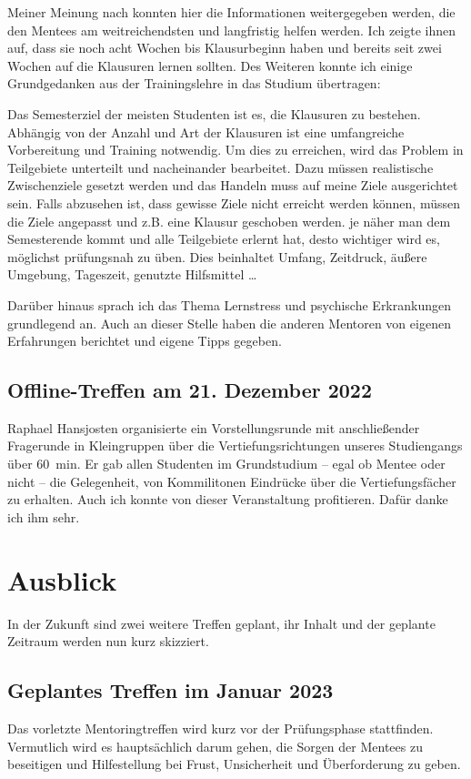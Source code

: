 \documentclass[
    paper=a4,
    div=calc,
    numbers=noendperiod,
    twocolumn,
]{scrartcl}
\begin{document}
        Meiner Meinung nach konnten hier die Informationen weitergegeben werden, die den Mentees am weitreichendsten und langfristig helfen werden. Ich zeigte ihnen auf, dass sie noch acht Wochen bis Klausurbeginn haben und bereits seit zwei Wochen auf die Klausuren lernen sollten. Des Weiteren konnte ich einige Grundgedanken aus der Trainingslehre in das Studium übertragen: 
        
        Das Semesterziel der meisten Studenten ist es, die Klausuren zu bestehen. Abhängig von der Anzahl und Art der Klausuren ist eine umfangreiche Vorbereitung und Training notwendig. Um dies zu erreichen, wird das Problem in Teilgebiete unterteilt und nacheinander bearbeitet. Dazu müssen realistische Zwischenziele gesetzt werden und das Handeln muss auf meine Ziele ausgerichtet sein. Falls abzusehen ist, dass gewisse Ziele nicht erreicht werden können, müssen die Ziele angepasst und z.B. eine Klausur geschoben werden. je näher man dem Semesterende kommt und alle Teilgebiete erlernt hat, desto wichtiger wird es, möglichst prüfungsnah zu üben. Dies beinhaltet Umfang, Zeitdruck, äußere Umgebung, Tageszeit, genutzte Hilfsmittel \dots

        Darüber hinaus sprach ich das Thema Lernstress und psychische Erkrankungen grundlegend an. Auch an dieser Stelle haben die anderen Mentoren von eigenen Erfahrungen berichtet und eigene Tipps gegeben.

    \subsection{Offline-Treffen am 21. Dezember 2022}
        Raphael Hansjosten organisierte ein Vorstellungsrunde mit anschließender Fragerunde in Kleingruppen über die Vertiefungsrichtungen unseres Studiengangs über \SI{60}{min}. Er gab allen Studenten im Grundstudium -- egal ob Mentee oder nicht -- die Gelegenheit, von Kommilitonen Eindrücke über die Vertiefungsfächer zu erhalten. Auch ich konnte von dieser Veranstaltung profitieren. Dafür danke ich ihm sehr.

\section{Ausblick}
    In der Zukunft sind zwei weitere Treffen geplant, ihr Inhalt und der geplante Zeitraum werden nun kurz skizziert.

    \subsection{Geplantes Treffen im Januar 2023}
        Das vorletzte Mentoringtreffen wird kurz vor der Prüfungsphase stattfinden. Vermutlich wird es hauptsächlich darum gehen, die Sorgen der Mentees zu beseitigen und Hilfestellung bei Frust, Unsicherheit und Überforderung zu geben. 
        
\end{document}
